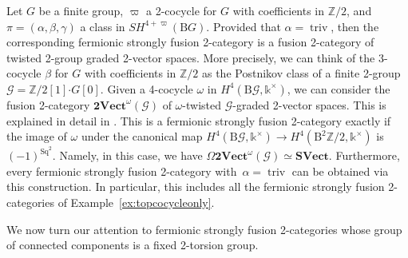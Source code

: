 \documentclass[pdftex]{sigma}
\numberwithin{equation}{section}
\begin{document}
\begin{Example}\label{ex:lin2group}
Let $G$ be a finite group, $\varpi$ a 2-cocycle for $G$ with coefficients in $\mathbb{Z}/2$, and $\pi=(\alpha,\beta,\gamma)$ a class in $SH^{4+\varpi}(\mathrm{B}G)$. Provided that $\alpha=\operatorname{triv}$, then the corresponding fermionic strongly fusion 2-category is a fusion 2-category of twisted 2-group graded 2-vector spaces. More precisely, we can think of the 3-cocycle $\beta$ for $G$ with coefficients in $\mathbb{Z}/2$ as the Postnikov class of a finite 2-group $\mathcal{G}=\mathbb{Z}/2[1]\boldsymbol{\cdot}G[0]$. Given a 4-cocycle $\omega$ in $H^4(\mathrm{B}\mathcal{G},\mathds{k}^{\times})$, we can consider the fusion 2-category $\mathbf{2Vect}^{\omega}(\mathcal{G})$ of $\omega$-twisted $\mathcal{G}$-graded 2-vector spaces. This is explained in detail in \cite[Construction 2.1.16]{DR}. This is a fermionic strongly fusion 2-category exactly if the image of $\omega$ under the canonical map $H^4(\mathrm{B}\mathcal{G},\mathds{k}^{\times})\rightarrow H^4(\mathrm{B}^2\mathbb{Z}/2,\mathds{k}^{\times})$ is $(-1)^{\mathrm{Sq}^2}$. Namely, in this case, we have $\Omega\mathbf{2Vect}^{\omega}(\mathcal{G})\simeq\mathbf{SVect}$. Furthermore, every fermionic strongly fusion 2-category with~${\alpha=\operatorname{triv}}$ can be obtained via this construction. In particular, this includes all the fermionic strongly fusion 2-categories of Example~\ref{ex:topcocycleonly}.
\end{Example}

We now turn our attention to fermionic strongly fusion 2-categories whose group of connected components is a fixed 2-torsion group.
\end{document}
